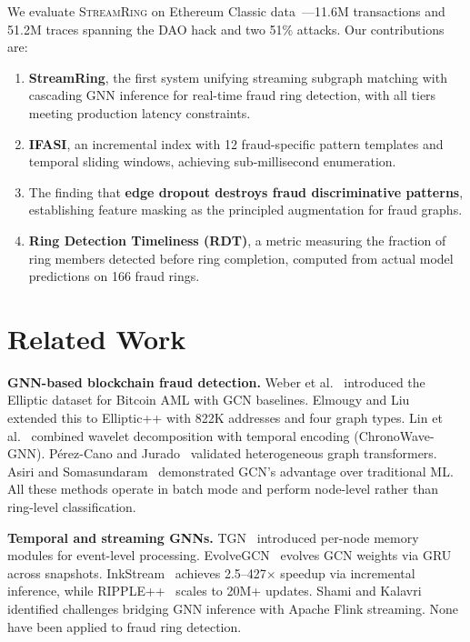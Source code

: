 \documentclass[sigconf, anonymous, review]{acmart}
\begin{document}
We evaluate \textsc{StreamRing} on Ethereum Classic data~\cite{ethereum_classic_kaggle}---11.6M transactions and 51.2M traces spanning the DAO hack and two 51\% attacks. Our contributions are:

\begin{enumerate}
    \item \textbf{StreamRing}, the first system unifying streaming subgraph matching with cascading GNN inference for real-time fraud ring detection, with all tiers meeting production latency constraints.
    \item \textbf{IFASI}, an incremental index with 12 fraud-specific pattern templates and temporal sliding windows, achieving sub-millisecond enumeration.
    \item The finding that \textbf{edge dropout destroys fraud discriminative patterns}, establishing feature masking as the principled augmentation for fraud graphs.
    \item \textbf{Ring Detection Timeliness (RDT)}, a metric measuring the fraction of ring members detected before ring completion, computed from actual model predictions on 166 fraud rings.
\end{enumerate}

\section{Related Work}
\label{sec:related}

\textbf{GNN-based blockchain fraud detection.} Weber et al.~\cite{weber2019} introduced the Elliptic dataset for Bitcoin AML with GCN baselines. Elmougy and Liu~\cite{ellipticpp2023} extended this to Elliptic++ with 822K addresses and four graph types. Lin et al.~\cite{chronowave2025} combined wavelet decomposition with temporal encoding (ChronoWave-GNN). P\'{e}rez-Cano and Jurado~\cite{perezcano2025} validated heterogeneous graph transformers. Asiri and Somasundaram~\cite{asiri2025} demonstrated GCN's advantage over traditional ML. All these methods operate in batch mode and perform node-level rather than ring-level classification.

\textbf{Temporal and streaming GNNs.} TGN~\cite{tgn2020} introduced per-node memory modules for event-level processing. EvolveGCN~\cite{evolvegcn2020} evolves GCN weights via GRU across snapshots. InkStream~\cite{inkstream2023} achieves 2.5--427$\times$ speedup via incremental inference, while RIPPLE++~\cite{ripple2025} scales to 20M+ updates. Shami and Kalavri~\cite{shami2025} identified challenges bridging GNN inference with Apache Flink streaming. None have been applied to fraud ring detection.
\end{document}
